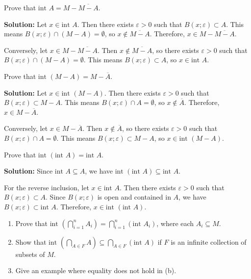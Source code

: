 \begin{problembox}
Prove that \(\text{int } A = M - \overline{M - A}\).
\end{problembox}

\textbf{Solution:} Let $x \in \text{int } A$. Then there exists $\varepsilon > 0$ such that $B(x;\varepsilon) \subset A$. This means $B(x;\varepsilon) \cap (M - A) = \emptyset$, so $x \notin \overline{M - A}$. Therefore, $x \in M - \overline{M - A}$.

Conversely, let $x \in M - \overline{M - A}$. Then $x \notin \overline{M - A}$, so there exists $\varepsilon > 0$ such that $B(x;\varepsilon) \cap (M - A) = \emptyset$. This means $B(x;\varepsilon) \subset A$, so $x \in \text{int } A$.

\begin{problembox}
Prove that \(\text{int }(M - A) = M - \overline{A}\).
\end{problembox}

\textbf{Solution:} Let $x \in \text{int }(M - A)$. Then there exists $\varepsilon > 0$ such that $B(x;\varepsilon) \subset M - A$. This means $B(x;\varepsilon) \cap A = \emptyset$, so $x \notin \overline{A}$. Therefore, $x \in M - \overline{A}$.

Conversely, let $x \in M - \overline{A}$. Then $x \notin \overline{A}$, so there exists $\varepsilon > 0$ such that $B(x;\varepsilon) \cap A = \emptyset$. This means $B(x;\varepsilon) \subset M - A$, so $x \in \text{int }(M - A)$.

\begin{problembox}
Prove that \(\text{int }(\text{int } A) = \text{int } A\).
\end{problembox}

\textbf{Solution:} Since $\text{int } A \subseteq A$, we have $\text{int }(\text{int } A) \subseteq \text{int } A$.

For the reverse inclusion, let $x \in \text{int } A$. Then there exists $\varepsilon > 0$ such that $B(x;\varepsilon) \subset A$. Since $B(x;\varepsilon)$ is open and contained in $A$, we have $B(x;\varepsilon) \subset \text{int } A$. Therefore, $x \in \text{int }(\text{int } A)$.

\begin{problembox}
\begin{enumerate}[label=\alph*)]
\item Prove that \(\text{int } \left(\bigcap_{i=1}^n A_i\right) = \bigcap_{i=1}^n (\text{int } A_i)\), where each \( A_i \subseteq M \).
\item Show that \(\text{int } \left(\bigcap_{A \in F} A\right) \subseteq \bigcap_{A \in F} (\text{int } A)\) if \( F \) is an infinite collection of subsets of \( M \).
\item Give an example where equality does not hold in (b).
\end{enumerate}
\end{problembox}

